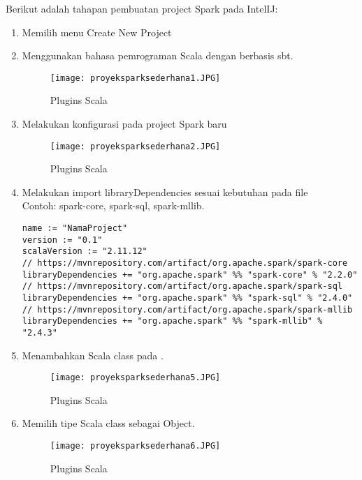 \noindent Berikut adalah tahapan pembuatan project Spark pada IntelIJ:

\begin{enumerate}
\item Memilih menu Create New Project

\item Menggunakan bahasa pemrograman Scala dengan berbasis sbt.
\begin{figure}[H]
	\centering
	\texttt{[image: proyeksparksederhana1.JPG]}
	\caption{Plugins Scala}
	\label{fig:proyeksparksederhana1.JPG}
\end{figure}

\item Melakukan konfigurasi pada project Spark baru
\begin{figure}[H]
	\centering
	\texttt{[image: proyeksparksederhana2.JPG]}
	\caption{Plugins Scala}
	\label{fig:proyeksparksederhana2.JPG}
\end{figure}

\item Melakukan import libraryDependencies sesuai kebutuhan pada file  \\ 
Contoh: spark-core, spark-sql, spark-mllib.
\begin{lstlisting}[basicstyle=\ttfamily, frame=single,
	columns=fullflexible, keepspaces=true, breaklines=true, label=ls_kepatuhan_1_1_1_logo_sharif_judge, caption=Main method]
name := "NamaProject"
version := "0.1"
scalaVersion := "2.11.12"
// https://mvnrepository.com/artifact/org.apache.spark/spark-core
libraryDependencies += "org.apache.spark" %% "spark-core" % "2.2.0"
// https://mvnrepository.com/artifact/org.apache.spark/spark-sql
libraryDependencies += "org.apache.spark" %% "spark-sql" % "2.4.0"
// https://mvnrepository.com/artifact/org.apache.spark/spark-mllib
libraryDependencies += "org.apache.spark" %% "spark-mllib" % "2.4.3"

\end{lstlisting}

\item Menambahkan Scala class pada .  
\begin{figure}[H]
	\centering
	\texttt{[image: proyeksparksederhana5.JPG]}
	\caption{Plugins Scala}
	\label{fig:proyeksparksederhana5.JPG}
\end{figure}

\item Memilih tipe Scala class sebagai Object.
\begin{figure}[H]
	\centering
	\texttt{[image: proyeksparksederhana6.JPG]}
	\caption{Plugins Scala}
	\label{fig:proyeksparksederhana6.JPG}
\end{figure}


\end{enumerate}
